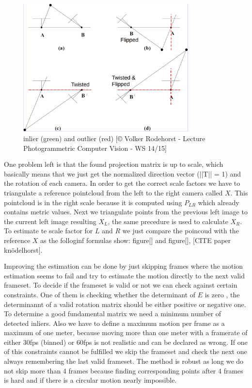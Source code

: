 \documentclass[11pt]{article}
\begin{document}
	\begin{figure}[ht!]
		\centering
		\includegraphics[width=90mm]{images/possible_P_Mats.png}
		\caption{inlier (green) and outlier (red) [© Volker Rodehorst - Lecture Photogrammetric Computer Vision - WS 14/15]
			 \label{overflow}}
	\end{figure}

	One problem left is that the found projection matrix is up to scale, which basically means that we just get the normalized direction vector (||T|| = 1) and the rotation of each camera. In order to get the correct scale factors we have to triangulate a reference pointcloud from the left to the right camera called $X$. This pointcloud is in the right scale because it is computed using $P_{LR}$ which already contains metric values. Next we triangulate points from the previous left image to the current left image resulting $X_L$, the same precedure is used to calculate $X_R$. To estimate te scale factor for $L$ and $R$ we just compare the poincoud with the reference $X$ as the folloginf formulas show: figure[] and figure[], [CITE paper knödelhorst].

	Improving the estimation can be done by just skipping frames where the motion estimation seems to fail and try to estimate the motion directly to the next valid frameset. To decide if the frameset is valid or not we can check against certain constraints. One of them is checking whether the determinant of $E$ is zero 
	, the determinannt of a valid rotation matrix should be either positive or negative one. To determine a good fundamental matrix we need a minimum number of detected inliers. Also we have to define a maximum motion per frame as a maximum of one meter, because moving more than one meter with a framerate of either 30fps (binned) or 60fps is not realistic and can be declared as wrong. If one of this constraints cannot be fulfilled we skip the frameset and check the next one always remembering the last valid frameset. The method is robust as long we do not skip more than 4 frames because finding corresponding points after 4 frames is hard and if there is a circular motion nearly impossible. 
\end{document}
